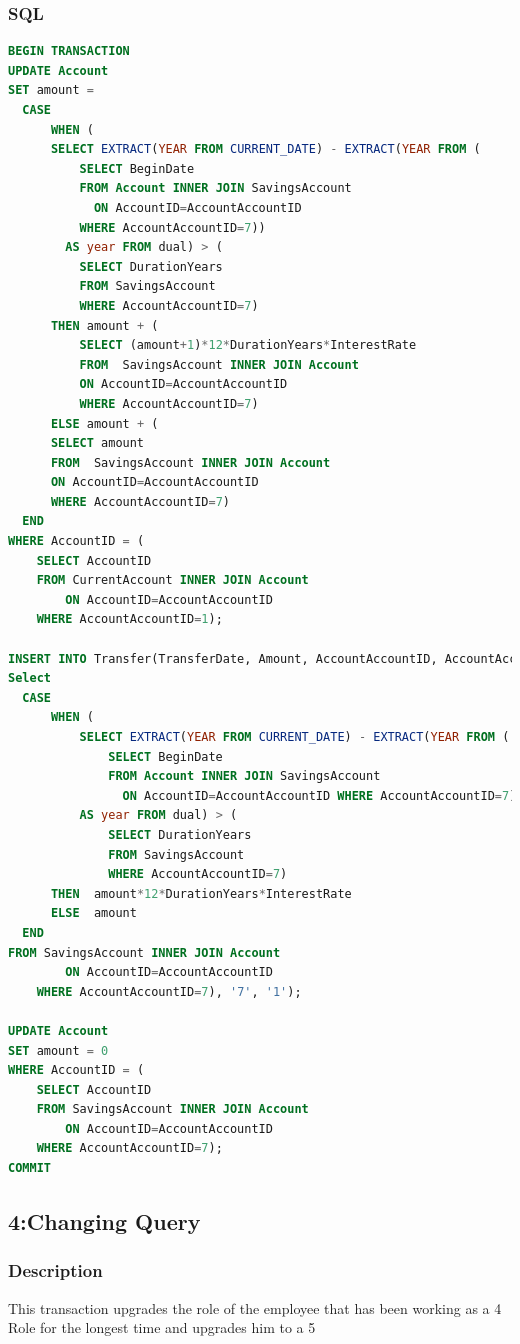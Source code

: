 \documentclass[a4paper, 10pt]{article}
\begin{document}
\subsubsection{SQL}
\begin{lstlisting}[language=SQL]
BEGIN TRANSACTION
UPDATE Account 
SET amount =     
  CASE          
      WHEN (
      SELECT EXTRACT(YEAR FROM CURRENT_DATE) - EXTRACT(YEAR FROM (
          SELECT BeginDate 
          FROM Account INNER JOIN SavingsAccount 
            ON AccountID=AccountAccountID 
          WHERE AccountAccountID=7))
        AS year FROM dual) > (
          SELECT DurationYears 
          FROM SavingsAccount 
          WHERE AccountAccountID=7)
      THEN amount + ( 
          SELECT (amount+1)*12*DurationYears*InterestRate 
          FROM  SavingsAccount INNER JOIN Account 
          ON AccountID=AccountAccountID 
          WHERE AccountAccountID=7)   
      ELSE amount + ( 
      SELECT amount 
      FROM  SavingsAccount INNER JOIN Account 
      ON AccountID=AccountAccountID 
      WHERE AccountAccountID=7) 
  END 
WHERE AccountID = (
    SELECT AccountID 
    FROM CurrentAccount INNER JOIN Account 
        ON AccountID=AccountAccountID 
    WHERE AccountAccountID=1);

INSERT INTO Transfer(TransferDate, Amount, AccountAccountID, AccountAccountID2) VALUES (CURRENT_DATE, (
Select
  CASE
      WHEN (
          SELECT EXTRACT(YEAR FROM CURRENT_DATE) - EXTRACT(YEAR FROM (
              SELECT BeginDate 
              FROM Account INNER JOIN SavingsAccount 
                ON AccountID=AccountAccountID WHERE AccountAccountID=7)) 
          AS year FROM dual) > (
              SELECT DurationYears 
              FROM SavingsAccount 
              WHERE AccountAccountID=7)
      THEN  amount*12*DurationYears*InterestRate
      ELSE  amount
  END
FROM SavingsAccount INNER JOIN Account
        ON AccountID=AccountAccountID
    WHERE AccountAccountID=7), '7', '1');

UPDATE Account
SET amount = 0
WHERE AccountID = (
    SELECT AccountID 
    FROM SavingsAccount INNER JOIN Account 
        ON AccountID=AccountAccountID 
    WHERE AccountAccountID=7);
COMMIT
\end{lstlisting}

\subsection{4:Changing Query}
\subsubsection{Description}
This transaction upgrades the role of the employee that has been working as a 4 Role for the longest time and upgrades him to a 5
\end{document}
